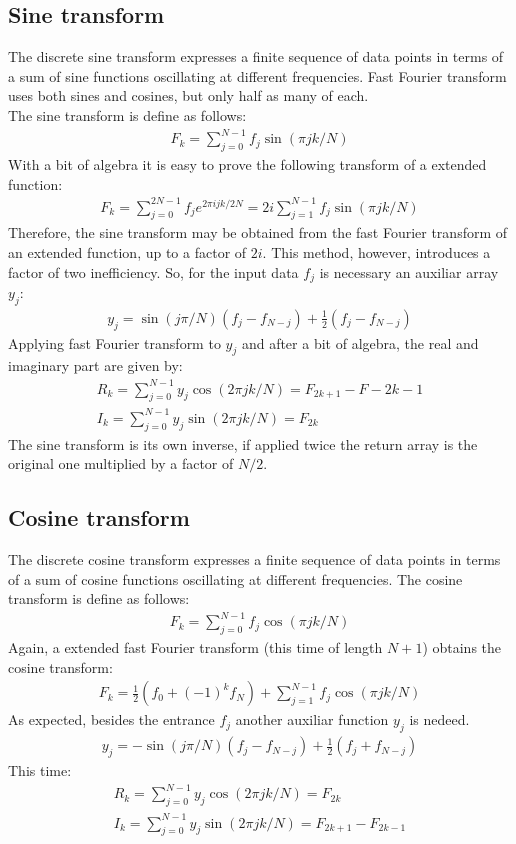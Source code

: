 \documentclass[letterpaper]{article}
\begin{document}
\subsection{Sine transform} 
The discrete sine transform expresses a finite sequence of data points in terms of a sum of sine functions oscillating at different frequencies. Fast Fourier transform uses both sines and cosines, but only half as many of each.\\
The sine transform is define as follows:
\begin{align}
F_k= \sum_{j=0}^{N-1}f_j \sin(\pi j k /N)	
\end{align}
With a bit of algebra it is easy to prove the following transform of a extended function:
\begin{align}
F_k=\sum_{j=0}^{2N-1}f_je^{2\pi i j k / 2N}= 2i\sum_{j=1}^{N-1}f_j \sin(\pi j k /N)	
\end{align}
Therefore, the sine transform may be obtained from the fast Fourier transform of  an extended function, up to a factor of $2i$. This method, however, introduces a factor of two inefficiency.	So, for the input data $f_j$ is necessary an auxiliar array $y_j$:
\begin{align}
y_j=\sin(j\pi /N)(f_j-f_{N-j})+\frac{1}{2}(f_j-f_{N-j})
\end{align}
Applying fast Fourier transform to $y_j$ and after a bit of algebra, the real and imaginary part are given by:
\begin{align}
R_k=\sum_{j=0}^{N-1}y_j\cos(2\pi jk/N)=F_{2k+1}-F-{2k-1}\\
I_k=\sum_{j=0}^{N-1}y_j\sin(2\pi jk/N)=F_{2k}
\end{align}
The sine transform is its own inverse, if applied twice the return array is the original one multiplied by a factor  of $N/2$.

\subsection{Cosine transform}
The discrete cosine transform expresses a finite sequence of data points in terms of a sum of cosine functions oscillating at different frequencies.
The cosine transform is define as follows:
\begin{align}
F_k= \sum_{j=0}^{N-1}f_j \cos(\pi j k /N)	
\end{align}
Again, a extended fast Fourier transform (this time of length $N+1$) obtains the cosine transform:
\begin{align}
F_k= \frac{1}{2}(f_0+(-1)^kf_N)+\sum_{j=1}^{N-1}f_j \cos(\pi j k /N)	
\end{align}
As expected, besides the entrance $f_j$ another auxiliar function $y_j$ is nedeed.
\begin{align}
y_j=-\sin(j\pi /N)(f_j-f_{N-j})+\frac{1}{2}(f_j+f_{N-j})
\end{align}
This time:
\begin{align}
R_k=\sum_{j=0}^{N-1}y_j\cos(2\pi jk/N)=F_{2k}\\
I_k=\sum_{j=0}^{N-1}y_j\sin(2\pi jk/N)=F_{2k+1}-F_{2k-1}
\end{align}
\end{document}
